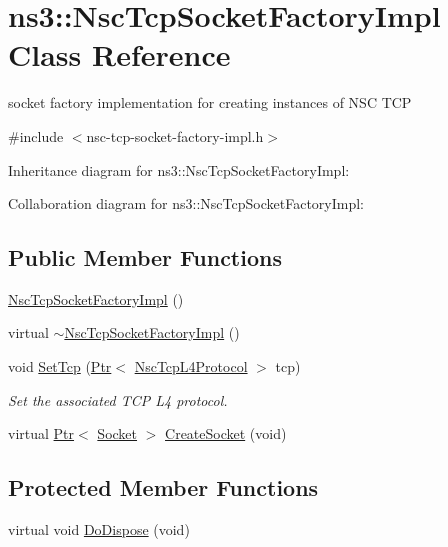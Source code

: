 \hypertarget{classns3_1_1NscTcpSocketFactoryImpl}{}\section{ns3\+:\+:Nsc\+Tcp\+Socket\+Factory\+Impl Class Reference}
\label{classns3_1_1NscTcpSocketFactoryImpl}


socket factory implementation for creating instances of N\+SC T\+CP  




{\ttfamily \#include $<$nsc-\/tcp-\/socket-\/factory-\/impl.\+h$>$}



Inheritance diagram for ns3\+:\+:Nsc\+Tcp\+Socket\+Factory\+Impl\+:


Collaboration diagram for ns3\+:\+:Nsc\+Tcp\+Socket\+Factory\+Impl\+:
\subsection*{Public Member Functions}
\begin{DoxyCompactItemize}
\item 
\hyperlink{classns3_1_1NscTcpSocketFactoryImpl_a6c70a721ae850b559b05b7beaaf33d2a}{Nsc\+Tcp\+Socket\+Factory\+Impl} ()
\item 
virtual \hyperlink{classns3_1_1NscTcpSocketFactoryImpl_a4f3bf8021413b98e628f5dbd2d095e29}{$\sim$\+Nsc\+Tcp\+Socket\+Factory\+Impl} ()
\item 
void \hyperlink{classns3_1_1NscTcpSocketFactoryImpl_a056f4496f2f3f4218c0bcfec01b14dd6}{Set\+Tcp} (\hyperlink{classns3_1_1Ptr}{Ptr}$<$ \hyperlink{classns3_1_1NscTcpL4Protocol}{Nsc\+Tcp\+L4\+Protocol} $>$ tcp)
\begin{DoxyCompactList}\small\item\em Set the associated T\+CP L4 protocol. \end{DoxyCompactList}\item 
virtual \hyperlink{classns3_1_1Ptr}{Ptr}$<$ \hyperlink{classns3_1_1Socket}{Socket} $>$ \hyperlink{classns3_1_1NscTcpSocketFactoryImpl_aa105f498f6ccc7d1fa7c5afb9523ebdc}{Create\+Socket} (void)
\end{DoxyCompactItemize}
\subsection*{Protected Member Functions}
\begin{DoxyCompactItemize}
\item 
virtual void \hyperlink{classns3_1_1NscTcpSocketFactoryImpl_aa3e92ea5c8c44ab4c80187f942d2de60}{Do\+Dispose} (void)
\end{DoxyCompactItemize}
